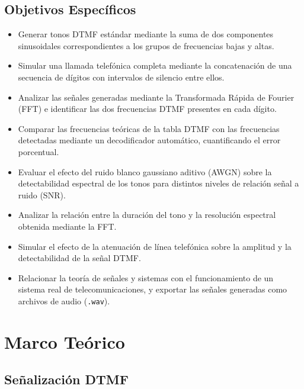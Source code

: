 \documentclass[conference]{IEEEtran}
\begin{document}
\subsection{Objetivos Específicos}
\begin{itemize}
    \item Generar tonos DTMF estándar mediante la suma de dos componentes sinusoidales correspondientes a los grupos de frecuencias bajas y altas.

    \item Simular una llamada telefónica completa mediante la concatenación de una secuencia de dígitos con intervalos de silencio entre ellos.

    \item Analizar las señales generadas mediante la Transformada Rápida de Fourier (FFT) e identificar las dos frecuencias DTMF presentes en cada dígito.

    \item Comparar las frecuencias teóricas de la tabla DTMF con las frecuencias detectadas mediante un decodificador automático, cuantificando el error porcentual.

    \item Evaluar el efecto del ruido blanco gaussiano aditivo (AWGN) sobre la detectabilidad espectral de los tonos para distintos niveles de relación señal a ruido (SNR).

    \item Analizar la relación entre la duración del tono y la resolución espectral obtenida mediante la FFT.

    \item Simular el efecto de la atenuación de línea telefónica sobre la amplitud y la detectabilidad de la señal DTMF.

    \item Relacionar la teoría de señales y sistemas con el funcionamiento de un sistema real de telecomunicaciones, y exportar las señales generadas como archivos de audio (\texttt{.wav}).
\end{itemize}

\section{Marco Teórico}

\subsection{Señalización DTMF}
\end{document}
